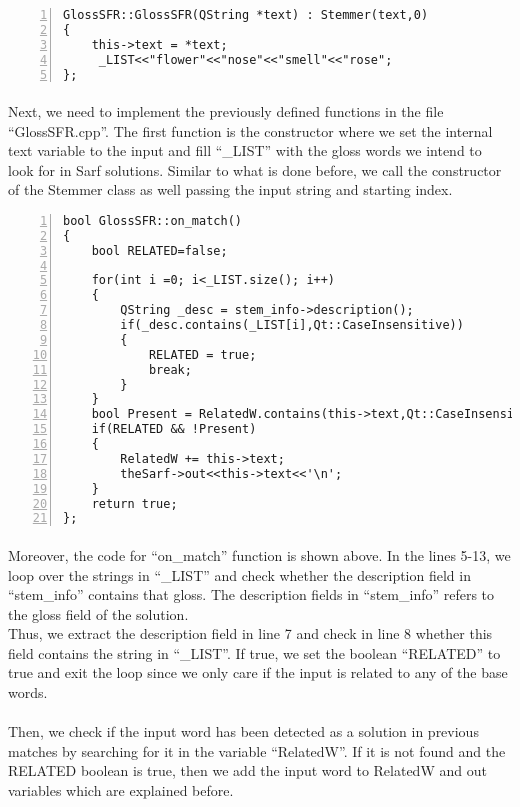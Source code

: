 \documentclass{article}
\begin{document}
\begin{Verbatim}[numbers=left]
GlossSFR::GlossSFR(QString *text) : Stemmer(text,0)
{
    this->text = *text;
     _LIST<<"flower"<<"nose"<<"smell"<<"rose";
};
\end{Verbatim}

\paragraph{}
Next, we need to implement the previously defined functions in the file ``GlossSFR.cpp''. The first function is the constructor where we set the internal text variable to the input and fill ``\_LIST'' with the gloss words we intend to look for in Sarf solutions. Similar to what is done before, we call the constructor of the Stemmer class as well passing the input string and starting index.

\begin{Verbatim}[numbers=left]
bool GlossSFR::on_match()
{
    bool RELATED=false;

    for(int i =0; i<_LIST.size(); i++)
    {
        QString _desc = stem_info->description();
        if(_desc.contains(_LIST[i],Qt::CaseInsensitive))
        {
            RELATED = true;
            break;
        }
    }
    bool Present = RelatedW.contains(this->text,Qt::CaseInsensitive);
    if(RELATED && !Present)
    {
        RelatedW += this->text;
        theSarf->out<<this->text<<'\n';
    }
    return true;
};
\end{Verbatim}

\paragraph{}
Moreover, the code for ``on\_match'' function is shown above. In the lines 5-13, we loop over the strings in ``\_LIST'' and check whether the description field in ``stem\_info'' contains that gloss. The description fields in ``stem\_info'' refers to the gloss field of the solution.\\
Thus, we extract the description field in line 7 and check in line 8 whether this field contains the string in ``\_LIST''.  If true, we set the boolean ``RELATED'' to true and exit the loop since we only care if the input is related to any of the base words.

\paragraph{}
Then, we check if the input word has been detected as a solution in previous matches by searching for it in the variable ``RelatedW''. If it is not found and the RELATED boolean is true, then we add the input word to RelatedW and out variables which are explained before.
\end{document}
